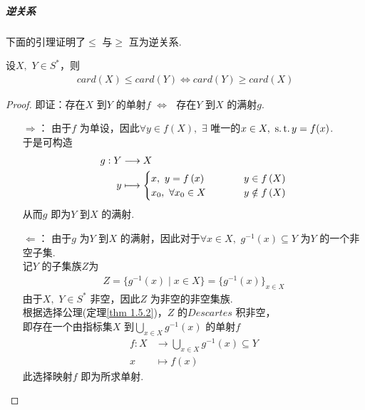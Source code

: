 	\vspace*{2em}
	\subparagraph{逆关系}
		下面的引理证明了$\leq$ 与$\geq$ 互为逆关系.
		\begin{lemma}\label{lemma 1.6.1}
			设$X , \,\, Y \in S^*$，则
			\begin{align}
				card(X) \leq card(Y) \Leftrightarrow card(Y) \geq card(X)
			\end{align}
			\begin{proof}
				即证：存在$X$ 到$Y$ 的单射$f \,\, \Leftrightarrow \,\,$ 存在$Y$ 到$X$ 的满射$g$.
				\begin{enumerate}
					\item[$\Rightarrow$：]由于$f$ 为单设，因此$\forall y \in f(X) , \,\, \exists$ 唯一的$x \in X , \,\, \operatorname{s.t.} y = f(x)$.\\
					于是可构造
					\begin{align}
						g : Y &\longrightarrow X\\
						y &\longmapsto \begin{cases}
							x , \,\, y=f\left( x \right) \hspace*{3em} &y\in f\left( X \right)\\
							x_0 , \,\, \forall x_0\in X                &y\notin f\left( X \right)
						\end{cases}
					\end{align}
					从而$g$ 即为$Y$ 到$X$ 的满射.
					
					\item[$\Leftarrow$：]由于$g$ 为$Y$ 到$X$ 的满射，因此对于$\forall x \in X , \,\, g^{-1}(x) \subseteq Y$ 为$Y$ 的一个非空子集.\\
					记$Y$ 的子集族$Z$为
					\begin{align}
						Z = \{ g^{-1}(x) \mid x \in X \} = \{ g^{-1}(x) \}_{x \in X}
					\end{align}
					由于$X , \,\, Y \in S^*$ 非空，因此$Z$ 为非空的非空集族.\\
					根据选择公理(定理\ref{thm 1.5.2})，$Z$ 的$Descartes$ 积非空，\\
					即存在一个由指标集$X$ 到$\underset{x \in X}{\bigcup}{g^{-1}(x)}$ 的单射$f$
					\begin{align}
						f : X &\longrightarrow \bigcup_{x \in X}{g^{-1}(x)} \subseteq Y\\
						x &\longmapsto f(x)
					\end{align}
					此选择映射$f$ 即为所求单射.
				\end{enumerate}
			\end{proof}
		\end{lemma}
	
